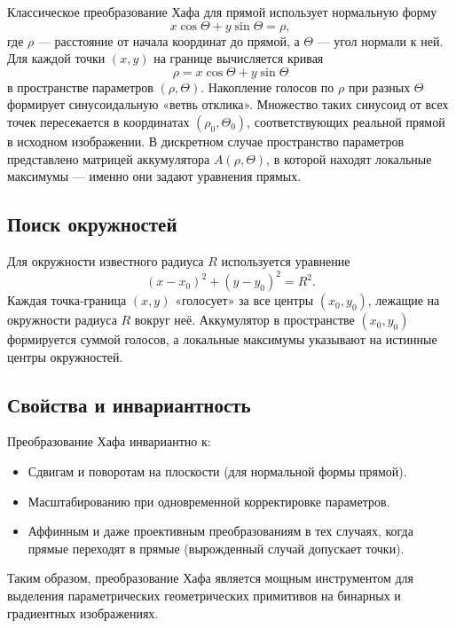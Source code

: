 \documentclass[a4paper,12pt]{article}
\begin{document}
Классическое преобразование Хафа для прямой использует нормальную форму
\[
  x\cos\Theta + y\sin\Theta = \rho,
  \label{eq:normal_form}
\]
где $\rho$ — расстояние от начала координат до прямой, а $\Theta$ — угол нормали к ней. Для каждой точки $(x,y)$ на границе вычисляется кривая
\[
  \rho = x\cos\Theta + y\sin\Theta
\]
в пространстве параметров $(\rho,\Theta)$. Накопление голосов по $\rho$ при разных $\Theta$ формирует синусоидальную «ветвь отклика». Множество таких синусоид от всех точек пересекается в координатах $(\rho_0,\Theta_0)$, соответствующих реальной прямой в исходном изображении.
В дискретном случае пространство параметров представлено матрицей аккуму­лятора $A(\rho,\Theta)$, в которой находят локальные максимумы — именно они задают уравнения прямых.

\subsection*{Поиск окружностей}

Для окружности известного радиуса $R$ используется уравнение
\[
  (x - x_0)^2 + (y - y_0)^2 = R^2.
  \label{eq:circle_form}
\]
Каждая точка-граница $(x,y)$ «голосует» за все центры $(x_0,y_0)$, лежащие на окружности радиуса $R$ вокруг неё. Аккумулятор в пространстве $(x_0,y_0)$ формируется суммой голосов, а локальные максимумы указывают на истинные центры окружностей.

\subsection*{Свойства и инвариантность}

Преобразование Хафа инвариантно к:
\begin{itemize}
  \item Сдвигам и поворотам на плоскости (для нормальной формы прямой).  
  \item Масштабированию при одновременной корректировке параметров.  
  \item Аффинным и даже проективным преобразованиям в тех случаях, когда прямые переходят в прямые (вырожденный случай допускает точки).  
\end{itemize}

Таким образом, преобразование Хафа является мощным инструментом для выделения параметрических геометрических примитивов на бинарных и градиентных изображениях.
\end{document}
